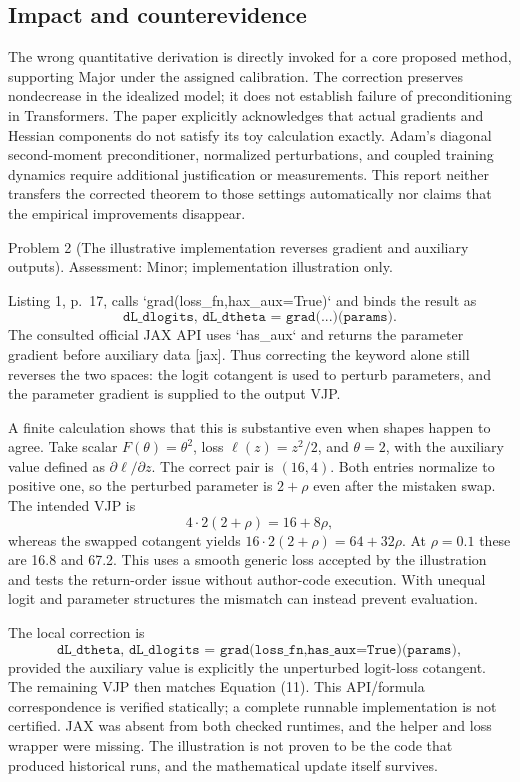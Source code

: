 \documentclass[10pt]{article}
\begin{document}
\subsection*{Impact and counterevidence}
The wrong quantitative derivation is directly invoked for a core proposed method, supporting Major under the assigned calibration. The correction preserves nondecrease in the idealized model; it does not establish failure of preconditioning in Transformers. The paper explicitly acknowledges that actual gradients and Hessian components do not satisfy its toy calculation exactly. Adam’s diagonal second-moment preconditioner, normalized perturbations, and coupled training dynamics require additional justification or measurements. This report neither transfers the corrected theorem to those settings automatically nor claims that the empirical improvements disappear.\par
Problem 2 (The illustrative implementation reverses gradient and auxiliary outputs).  Assessment: Minor; implementation illustration only.\par
Listing 1, p. 17, calls `grad(loss\_fn,hax\_aux=True)` and binds the result as \[\texttt{dL\_dlogits,\ dL\_dtheta = grad(...)(params)}.\] The consulted official JAX API uses `has\_aux` and returns the parameter gradient before auxiliary data [jax]. Thus correcting the keyword alone still reverses the two spaces: the logit cotangent is used to perturb parameters, and the parameter gradient is supplied to the output VJP.\par
A finite calculation shows that this is substantive even when shapes happen to agree. Take scalar \(F(\theta)=\theta^2\), loss \(\ell(z)=z^2/2\), and \(\theta=2\), with the auxiliary value defined as \(\partial\ell/\partial z\). The correct pair is \((16,4)\). Both entries normalize to positive one, so the perturbed parameter is \(2+\rho\) even after the mistaken swap. The intended VJP is \[4\cdot2(2+\rho)=16+8\rho,\] whereas the swapped cotangent yields \(16\cdot2(2+\rho)=64+32\rho\). At \(\rho=0.1\) these are 16.8 and 67.2. This uses a smooth generic loss accepted by the illustration and tests the return-order issue without author-code execution. With unequal logit and parameter structures the mismatch can instead prevent evaluation.\par
The local correction is \[\texttt{dL\_dtheta,\ dL\_dlogits =
 grad(loss\_fn,has\_aux=True)(params)},\] provided the auxiliary value is explicitly the unperturbed logit-loss cotangent. The remaining VJP then matches Equation (11). This API/formula correspondence is verified statically; a complete runnable implementation is not certified. JAX was absent from both checked runtimes, and the helper and loss wrapper were missing. The illustration is not proven to be the code that produced historical runs, and the mathematical update itself survives.\par
\end{document}
